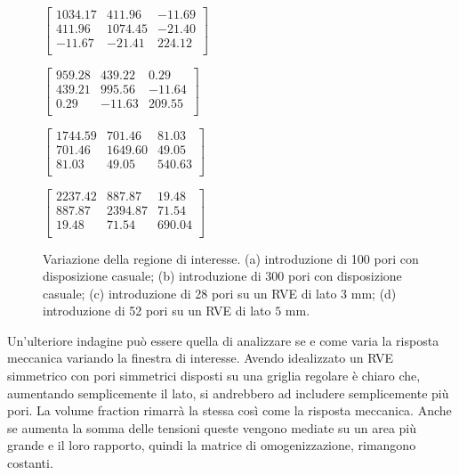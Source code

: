 \documentclass[a4paper,num-refs]{oup-contemporary}
\begin{document}
\begin{figure}
\begin{center}
\begin{minipage}[b]{0.24\linewidth}
					\newline
	\end{minipage} 
\hfill
	\begin{minipage}[b]{0.24\linewidth}
\centering
		\footnotesize{$
			\begin{bmatrix}
			 1034.17 & 411.96 & -11.69 \\
			411.96 & 1074.45 & -21.40 \\
			-11.67 & -21.41 & 224.12 \\
			\end{bmatrix}
			$}
	\end{minipage}
	\begin{minipage}[b]{0.24\linewidth}
\centering
		\footnotesize{$
			\begin{bmatrix}
			 959.28 & 439.22 & 0.29 \\
			439.21 & 995.56 & -11.64 \\
			0.29 & -11.63 & 209.55 \\
			\end{bmatrix}
			$}
	\end{minipage}
	\begin{minipage}[b]{0.24\linewidth}
\centering
		\footnotesize{$
			\begin{bmatrix}
			 1744.59 & 701.46 & 81.03 \\
			701.46 & 1649.60 & 49.05 \\
			81.03 & 49.05 & 540.63 \\
			\end{bmatrix}
			$}
	\end{minipage}
	\begin{minipage}[b]{0.24\linewidth}
\centering
		\footnotesize{$
			\begin{bmatrix}
			 2237.42 & 887.87 & 19.48 \\
			887.87 & 2394.87 & 71.54 \\
			19.48 & 71.54 & 690.04 \\
			\end{bmatrix}
			$}
	\end{minipage}
\hfill
	
	\caption{Variazione della regione di interesse. (a) introduzione di 100 pori con disposizione casuale; (b) introduzione di 300 pori con disposizione casuale; (c) introduzione di 28 pori su un RVE di lato $3$ mm; (d) introduzione di 52 pori su un RVE di lato $5$ mm.}
	\label{fig:area} 
\end{center}
\end{figure}


Un'ulteriore indagine può essere quella di analizzare se e come varia la risposta meccanica variando la finestra di interesse. Avendo idealizzato un RVE simmetrico con pori simmetrici disposti su una griglia regolare è chiaro che, aumentando semplicemente il lato, si andrebbero ad includere semplicemente più pori. La volume fraction rimarrà la stessa così come la risposta meccanica. Anche se aumenta la somma delle tensioni queste vengono mediate su un area più grande e il loro rapporto, quindi la matrice di omogenizzazione, rimangono costanti. 
\end{document}
